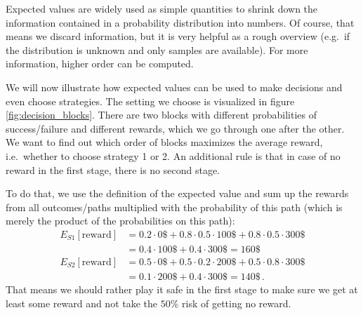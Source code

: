 Expected values are widely used as simple quantities to shrink down the information contained in a probability distribution into numbers. Of course, that means we discard information, but it is very helpful as a rough overview (e.g.~if the distribution is unknown and only samples are available). For more information, higher order  can be computed.

\begin{ex}
We will now illustrate how expected values can be used to make decisions and even choose strategies. The setting we choose is visualized in figure \ref{fig:decision_blocks}. There are two blocks with different probabilities of success/failure and different rewards, which we go through one after the other. We want to find out which order of blocks maximizes the average reward, i.e.~whether to choose strategy 1 or 2. An additional rule is that in case of no reward in the first stage, there is no second stage.

To do that, we use the definition of the expected value and sum up the rewards from all outcomes/paths multiplied with the probability of this path (which is merely the product of the probabilities on this path):
\begin{align*}
E_{S1}[\text{reward}] &= 0.2 \cdot 0\$ + 0.8 \cdot 0.5 \cdot 100\$ + 0.8 \cdot 0.5 \cdot 300\$
\\
&= 0.4 \cdot 100\$ + 0.4 \cdot 300\$ = 160\$
\\
E_{S2}[\text{reward}] &= 0.5 \cdot 0\$ + 0.5 \cdot 0.2 \cdot 200\$ + 0.5 \cdot 0.8 \cdot 300\$
\\
&= 0.1 \cdot 200\$ + 0.4 \cdot 300\$ = 140\$ \, .
\end{align*}
That means we should rather play it safe in the first stage to make sure we get at least some reward and not take the $50\%$ risk of getting no reward.
\end{ex}



